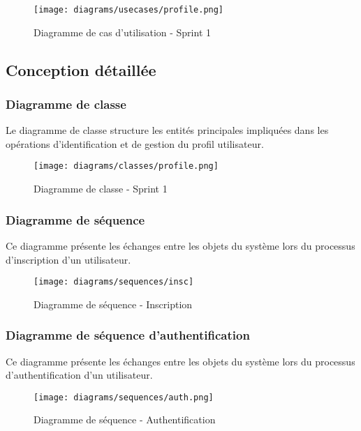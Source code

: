 \begin{figure}[H]
    \centering
    \texttt{[image: diagrams/usecases/profile.png]}
    \caption{Diagramme de cas d'utilisation - Sprint 1}
\end{figure}

\subsection{Conception détaillée}

\subsubsection{Diagramme de classe}

Le diagramme de classe structure les entités principales impliquées dans les opérations d’identification et de gestion du profil utilisateur.

\begin{figure}[H]
    \centering
\texttt{[image: diagrams/classes/profile.png]}
    \caption{Diagramme de classe - Sprint 1}
\end{figure}


\subsubsection{Diagramme de séquence}


Ce diagramme présente les échanges entre les objets du système lors du processus d’inscription d’un utilisateur.

\begin{figure}[H]
    \centering
    \texttt{[image: diagrams/sequences/insc]}
    \caption{Diagramme de séquence - Inscription}
\end{figure}

\subsubsection{Diagramme de séquence d'authentification}

Ce diagramme présente les échanges entre les objets du système lors du processus d’authentification d’un utilisateur.

\begin{figure}[H]
    \centering
    \texttt{[image: diagrams/sequences/auth.png]}
    \caption{Diagramme de séquence - Authentification}

\end{figure}

